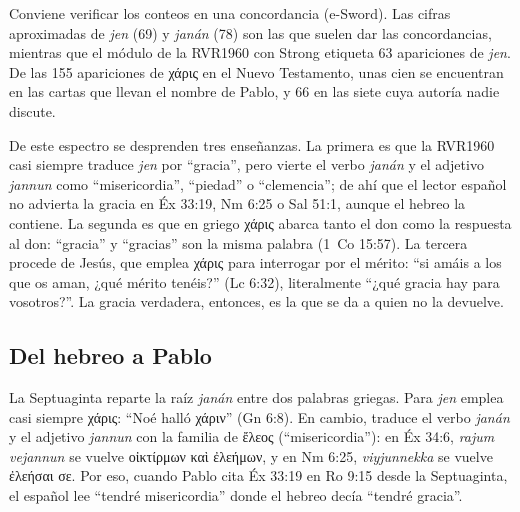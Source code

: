 \documentclass[11pt,letterpaper]{article}
\newcommand{\grc}[1]{\foreignlanguage{ancientgreek}{#1}}
\begin{document}
\begin{nota}[Precisión]
Conviene verificar los conteos en una concordancia (e-Sword). Las cifras aproximadas de \emph{jen} (69) y \emph{janán} (78) son las que suelen dar las concordancias, mientras que el módulo de la RVR1960 con Strong etiqueta 63 apariciones de \emph{jen}. De las 155 apariciones de \grc{χάρις} en el Nuevo Testamento, unas cien se encuentran en las cartas que llevan el nombre de Pablo, y 66 en las siete cuya autoría nadie discute.
\end{nota}

De este espectro se desprenden tres enseñanzas. La primera es que la RVR1960 casi siempre traduce \emph{jen} por ``gracia'', pero vierte el verbo \emph{janán} y el adjetivo \emph{jannun} como ``misericordia'', ``piedad'' o ``clemencia''; de ahí que el lector español no advierta la gracia en Éx 33:19, Nm 6:25 o Sal 51:1, aunque el hebreo la contiene. La segunda es que en griego \grc{χάρις} abarca tanto el don como la respuesta al don: ``gracia'' y ``gracias'' son la misma palabra (1~Co 15:57). La tercera procede de Jesús, que emplea \grc{χάρις} para interrogar por el mérito: ``si amáis a los que os aman, ¿qué mérito tenéis?'' (Lc 6:32), literalmente ``¿qué gracia hay para vosotros?''. La gracia verdadera, entonces, es la que se da a quien no la devuelve.

\subsection{Del hebreo a Pablo}
La Septuaginta reparte la raíz \emph{janán} entre dos palabras griegas. Para \emph{jen} emplea casi siempre \grc{χάρις}: ``Noé halló \grc{χάριν}'' (Gn 6:8). En cambio, traduce el verbo \emph{janán} y el adjetivo \emph{jannun} con la familia de \grc{ἔλεος} (``misericordia''): en Éx 34:6, \emph{rajum vejannun} se vuelve \grc{οἰκτίρμων καὶ ἐλεήμων}, y en Nm 6:25, \emph{viyjunnekka} se vuelve \grc{ἐλεήσαι σε}. Por eso, cuando Pablo cita Éx 33:19 en Ro 9:15 desde la Septuaginta, el español lee ``tendré misericordia'' donde el hebreo decía ``tendré gracia''.
\end{document}
